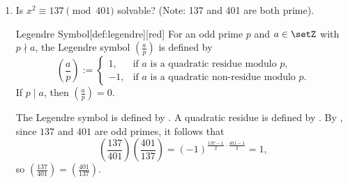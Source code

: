 \begin{enumerate}
\newpage
  \begin{define}{Theorem 4.9 (Quadratic Reciprocity)*}[thm:4.9][red]
    Let $p$ and $q$ be distinct odd primes. Then
    \[
    \left(\frac{p}{q}\right)\left(\frac{q}{p}\right)=(-1)^{\frac{p-1}{2}\cdot\frac{q-1}{2}}.
    \]
    Equivalently,
    \[
    \left(\frac{p}{q}\right)=\left(\frac{q}{p}\right)\quad\text{unless }p\equiv q\equiv 3\pmod 4,
    \]
    in which case
    \[
    \left(\frac{p}{q}\right)=-\left(\frac{q}{p}\right).
    \]
    \begin{subprove}
      The Legendre symbol is defined by .
      For distinct odd primes $p$ and $q$, let $N_1=\sum_{j=1}^{(q-1)/2}\lfloor jp/q\rfloor$ and $N_2=\sum_{j=1}^{(p-1)/2}\lfloor jq/p\rfloor$.
      By , it follows that the number of least positive residues of $jp \pmod{q}$ for $j=1,2,\ldots,(q-1)/2$ that are greater than $q/2$ equals $N_1$, so $\left(\frac{p}{q}\right)=(-1)^{N_1}$.
      Similarly, it follows that $\left(\frac{q}{p}\right)=(-1)^{N_2}$.
      A lattice-point count on $[0,(p-1)/2]\times[0,(q-1)/2]$ divided by $y=(q/p)x$ yields $N_1+N_2=(p-1)/2\cdot(q-1)/2$.
      Therefore, $\left(\frac{p}{q}\right)\left(\frac{q}{p}\right)=(-1)^{N_1+N_2}=(-1)^{\frac{p-1}{2}\cdot\frac{q-1}{2}}$.
    \end{subprove}
  \end{define}
  \item Is $x^{2} \equiv 137 \pmod{401}$ solvable? (Note: 137 and 401 are both prime).
  \begin{define}{Legendre Symbol}[def:legendre][red]
    For an odd prime $p$ and $a\in\setZ$ with $p\nmid a$, the Legendre symbol $\left(\frac{a}{p}\right)$ is defined by
    \[
    \left(\frac{a}{p}\right):=
    \begin{cases}
    1, & \text{if } a \text{ is a quadratic residue modulo } p,\\[4pt]
    -1, & \text{if } a \text{ is a quadratic non-residue modulo } p.
    \end{cases}
    \]
    If $p\mid a$, then $\left(\frac{a}{p}\right)=0$.
  \end{define}
  \begin{subanswer}
    The Legendre symbol is defined by .
    A quadratic residue is defined by .
    By , since $137$ and $401$ are odd primes, it follows that
    \[
    \left(\frac{137}{401}\right)\left(\frac{401}{137}\right)=(-1)^{\frac{137-1}{2}\cdot\frac{401-1}{2}}=1,
    \]
    so $\left(\frac{137}{401}\right)=\left(\frac{401}{137}\right)$.

\end{subanswer}
\end{enumerate}
